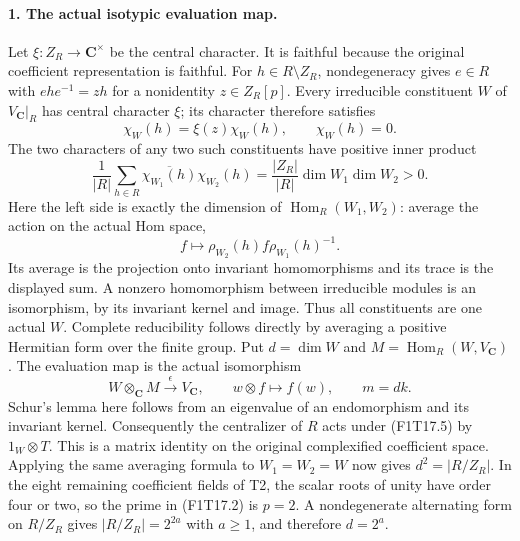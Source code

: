 \paragraph{1. The actual isotypic evaluation map.}
Let $\xi:Z_R\to\mathbf C^\times$ be the central character.
It is faithful because the original coefficient representation
is faithful. For $h\in R\setminus Z_R$, nondegeneracy gives
$e\in R$ with $ehe^{-1}=zh$ for a nonidentity
$z\in Z_R[p]$. Every irreducible constituent $W$ of
$V_{\mathbf C}|_R$ has central character $\xi$; its character
therefore satisfies
\[
 \chi_W(h)=\xi(z)\chi_W(h),\qquad \chi_W(h)=0.
 \tag{F1T17.3}
\]
The two characters of any two such constituents have positive
inner product
\[
 \frac1{|R|}\sum_{h\in R}
       \overline{\chi_{W_1}(h)}\chi_{W_2}(h)
       =\frac{|Z_R|}{|R|}\dim W_1\dim W_2>0.
 \tag{F1T17.4}
\]
Here the left side is exactly the dimension of
$\operatorname{Hom}_R(W_1,W_2)$: average the action on the actual Hom space,
\[
             f\longmapsto\rho_{W_2}(h)f\rho_{W_1}(h)^{-1}.
\] Its average is the projection onto invariant
homomorphisms and its trace is the displayed sum. A nonzero
homomorphism between irreducible modules is an isomorphism,
by its invariant kernel and image. Thus all constituents are
one actual $W$. Complete reducibility follows directly by
averaging a positive Hermitian form over the finite group.
Put $d=\dim W$ and $M=\operatorname{Hom}_R(W,V_{\mathbf C})$.
The evaluation map is the actual isomorphism
\[
 W\otimes_{\mathbf C}M\xrightarrow{\ \epsilon\ }V_{\mathbf C},
          \qquad w\otimes f\longmapsto f(w),\qquad m=dk.
 \tag{F1T17.5}
\]
Schur's lemma here follows from an eigenvalue of an endomorphism
and its invariant kernel. Consequently the centralizer of $R$
acts under (F1T17.5) by $1_W\otimes T$. This is a matrix
identity on the original complexified coefficient space.
Applying the same averaging formula to $W_1=W_2=W$ now gives
$d^2=|R/Z_R|$. In the eight remaining coefficient fields of T2,
the scalar roots of unity have order four or two, so the prime
in (F1T17.2) is $p=2$. A nondegenerate alternating form on
$R/Z_R$ gives $|R/Z_R|=2^{2a}$ with $a\ge1$, and therefore
$d=2^a$.

